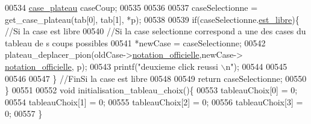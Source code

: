 \begin{DoxyCode}
00534         \hyperlink{structcase__plateau}{case_plateau} caseCoup;
00535 
00536 
00537         caseSelectionne = get\_case\_plateau(tab[0], tab[1], *p);
00538 
00539         \textcolor{keywordflow}{if}(caseSelectionne.\hyperlink{structcase__plateau_a173f25d2fd7c653d77ca8174ba4f636d}{est_libre})\{ \textcolor{comment}{//Si la case est libre}
00540                 \textcolor{comment}{//Si la case selectionne correspond a une des cases du tableau de
      s coups possibles}
00541                 *newCase = caseSelectionne;
00542                 plateau\_deplacer\_pion(oldCase->\hyperlink{structcase__plateau_ad510581b324604a9cf685cbb769a421a}{notation_officielle},newCase->
      \hyperlink{structcase__plateau_ad510581b324604a9cf685cbb769a421a}{notation_officielle}, p);
00543                 printf(\textcolor{stringliteral}{"deuxieme click reussi \(\backslash\)n"});
00544 
00545 
00546 
00547         \} \textcolor{comment}{//FinSi la case est libre}
00548 
00549         \textcolor{keywordflow}{return} caseSelectionne;
00550 \}
00551 
00552 \textcolor{keywordtype}{void} initialisation\_tableau\_choix()\{
00553         tableauChoix[0] = 0;
00554         tableauChoix[1] = 0;
00555         tableauChoix[2] = 0;
00556         tableauChoix[3] = 0;
00557 \}
\end{DoxyCode}
